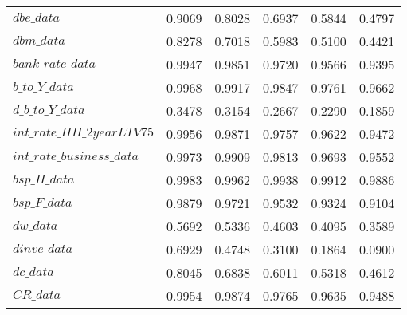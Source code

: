 \begin{center}
\begin{longtable}{lccccc}
$dbe\_data                  $	 & 	    0.9069	 & 	    0.8028	 & 	    0.6937	 & 	    0.5844	 & 	    0.4797 \\ 
$dbm\_data                  $	 & 	    0.8278	 & 	    0.7018	 & 	    0.5983	 & 	    0.5100	 & 	    0.4421 \\ 
$bank\_rate\_data           $	 & 	    0.9947	 & 	    0.9851	 & 	    0.9720	 & 	    0.9566	 & 	    0.9395 \\ 
$b\_to\_Y\_data             $	 & 	    0.9968	 & 	    0.9917	 & 	    0.9847	 & 	    0.9761	 & 	    0.9662 \\ 
$d\_b\_to\_Y\_data          $	 & 	    0.3478	 & 	    0.3154	 & 	    0.2667	 & 	    0.2290	 & 	    0.1859 \\ 
$int\_rate\_HH\_2yearLTV75  $	 & 	    0.9956	 & 	    0.9871	 & 	    0.9757	 & 	    0.9622	 & 	    0.9472 \\ 
$int\_rate\_business\_data  $	 & 	    0.9973	 & 	    0.9909	 & 	    0.9813	 & 	    0.9693	 & 	    0.9552 \\ 
$bsp\_H\_data               $	 & 	    0.9983	 & 	    0.9962	 & 	    0.9938	 & 	    0.9912	 & 	    0.9886 \\ 
$bsp\_F\_data               $	 & 	    0.9879	 & 	    0.9721	 & 	    0.9532	 & 	    0.9324	 & 	    0.9104 \\ 
$dw\_data                   $	 & 	    0.5692	 & 	    0.5336	 & 	    0.4603	 & 	    0.4095	 & 	    0.3589 \\ 
$dinve\_data                $	 & 	    0.6929	 & 	    0.4748	 & 	    0.3100	 & 	    0.1864	 & 	    0.0900 \\ 
$dc\_data                   $	 & 	    0.8045	 & 	    0.6838	 & 	    0.6011	 & 	    0.5318	 & 	    0.4612 \\ 
$CR\_data                   $	 & 	    0.9954	 & 	    0.9874	 & 	    0.9765	 & 	    0.9635	 & 	    0.9488 \\ 
\end{longtable}
 \end{center}

